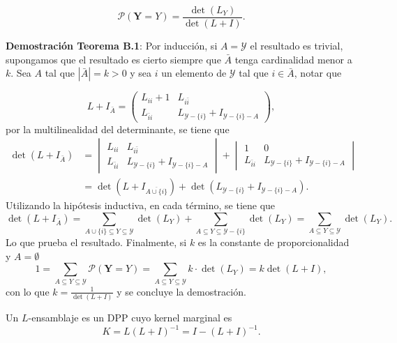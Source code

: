 \begin{appendixs}
\begin{teo}
    \[ \mathcal{P}(\mathbf{Y} = Y) = \frac{\det(L_Y)}{\det(L+I)} . \]
    \end{teo}
    
    \vspace{0.2cm}
    
    \noindent \textbf{Demostración Teorema B.1}: 
    Por inducción, si $A = \mathcal{Y}$ el resultado es trivial, supongamos que el resultado es cierto siempre que $\bar{A}$ tenga cardinalidad menor a $k$. Sea $A$ tal que $|\bar{A}| = k > 0$ y sea $i$ un elemento de $\mathcal{Y}$ tal que $i \in \bar{A}$, notar que 
    
    \[
    L + I_{\bar{A}} = 
    \begin{pmatrix}
    L_{ii}+1 & L_{i\bar{i}} \\ 
    L_{\bar{i}i} & L_{\mathcal{Y}-\{ i \}} + I_{\mathcal{Y} - \{ i \} - A} 
    \end{pmatrix} ,
    \]
    por la multilinealidad del determinante, se tiene que 
    \begin{align*}
    \det(L + I_{\bar{A}}) & = 
    \begin{vmatrix}
    L_{ii} & L_{i\bar{i}} \\ 
    L_{\bar{i}i} & L_{\mathcal{Y}-\{ i \}} + I_{\mathcal{Y} - \{ i \} - A}  
    \end{vmatrix} +
    \begin{vmatrix}
    1 & 0 \\ 
    L_{\bar{i}i} & L_{\mathcal{Y}-\{ i \}} + I_{\mathcal{Y} - \{ i \} - A}  
    \end{vmatrix} \\
    & = \det(L + I_{\overline{A \cup \{i \}}}) + \det(L_{\mathcal{Y} - \{i\}} + I_{\mathcal{Y}-\{i\}-A}) .
    \end{align*}
    Utilizando la hipótesis inductiva, en cada término, se tiene que 
    \[
    \det(L + I_{\bar{A}}) = \sum_{A \cup \{i\} \subseteq Y \subseteq \mathcal{Y}} \det(L_Y) + \sum_{A \subseteq Y \subseteq \mathcal{Y} - \{ i \}} \det(L_Y) = \sum_{A \subseteq Y \subseteq \mathcal{Y}}\det(L_Y) . 
    \]
    Lo que prueba el resultado. Finalmente, si $k$ es la constante de proporcionalidad y $A = \emptyset$
    \[
    1 = \sum_{A \subseteq Y \subseteq \mathcal{Y}}\mathcal{P}(\mathbf{Y} = Y) = \sum_{A \subseteq Y \subseteq \mathcal{Y}} k \cdot \det(L_Y) = k \det(L + I) , 
    \]
    con lo que $k = \frac{1}{\det(L + I)}$ y se concluye la demostración.
    
    \begin{teo}\hypertarget{Teorema B.2}{}
    Un $L$-ensamblaje es un DPP cuyo kernel marginal es 
    \[
    K = L(L+I)^{-1} = I - (L+I)^{-1} . 
    \]
    \end{teo}
    

\end{appendixs}
